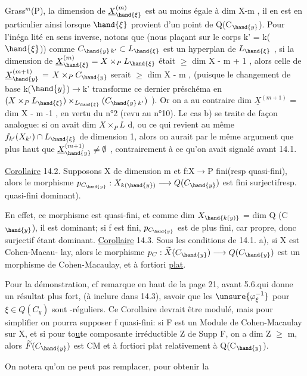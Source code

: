 
Grass$^{m}$(P), la dimension de $\underline{X}^{(m)}_{\hand{\xi}}$ est au moins égale à dim X-m , il en est
en particulier ainsi lorsque $\hand{\xi}$ provient d'un point de Q(C$_{\hand{y}}$). Pour l'inéga
lité en sens inverse, notons que (nous plaçant sur le corps k' = k($\hand{\xi}$))
comme $C_{\hand{y}\,k'} \subset L_{\hand{\xi}}$ est  un hyperplan de $L_{\hand{\xi}}$ , si la dimension de
$\underline{X}^{(m)}_{\hand{\xi}} = X\times_{P}L_{\hand{\xi}}$ était $\geqslant$ dim X - m + 1 , alors celle de $\underline{X}^{(m+1)}_{\hand{y}}$ =
$X\times_{P}C_{\hand{y}}$ serait $\geqslant$ dim X - m , (puisque le changement de base k($\hand{y}$)$\to$k'
transforme ce dernier préschéma en $(X\times_{P}L_{\hand{\xi}})\times_{L_{\hand{\xi}}}(C_{\hand{y}\,k'})$ ). Or on a au
contraire  dim $\underline{X}^{(m+1)}$ = dim X - m -1 
, en vertu du n°2 (revu au n°10).
Le cas b)  se traite
de façon analogue: si on avait dim $X\times_{P}L$ \hand{$\geqslant$} d,  ou
ce qui revient au même  $f_{k'}(X_{k'}) \cap L_{\hand{\xi}}$ de dimension \hand{$\geqslant$}1,
alors on aurait par le même argument que plus  haut que
$\underline{X}^{(m+1)}_{\hand{y}} \neq \emptyset$ , contrairement à ce qu'on avait signalé avant 14.1.

\uline{Corollaire} 14.2. Supposons X de dimension m et f:X$\to$P fini(resp quasi-fini), alors
le morphisme $p_{C_{\hand{y}}} : X_{k(\hand{y})} \longrightarrow Q(C_{\hand{y}})$ est fini surjectif\hand{(}resp. quasi-fini
dominant).

En effet, ce morphisme est quasi-fini, et comme dim $X_{\hand{k(y)}}$ = dim Q (C$_{\hand{y}}$), il est
dominant;  si f est fini, $p_{C_{\hand{y}}}$ est de plus fini,
 car propre, donc surjectif étant dominant.
\uline{Corollaire} 14.3. Sous les conditions de 14.1. a), si X est Cohen-Macau-%
lay, alors le morphisme $p_{C} : \widetilde{X}(C_{\hand{y}}) \longrightarrow Q(C_{\hand{y}})$ est un morphisme de
Cohen-Macaulay, et à fortiori \uline{plat}.

Pour la démonstration, cf remarque en haut de la page 21, avant 5.6.qui donne un résultat plus fort, (à inclure dans 14.3), savoir que les $\unsure{\varphi^{-1}_{\xi}}$ pour $\xi\in Q(C_{y})$ sont -réguliers.
Ce Corollaire devrait être modulé, mais pour simplifier on pourra
supposer f quasi-fini: si F est un Module de Cohen-Macaulay sur X, et si
pour to\uline{u}te composante irréductible Z de Supp F, on a dim Z $\geqslant$ m, alors
$\widetilde{F}(C_{\hand{y}})$ est CM \hand{(}et à fortiori plat\hand{)} relativement à Q(C$_{\hand{y}}$).

On notera qu'on ne peut pas remplacer, pour obtenir la


